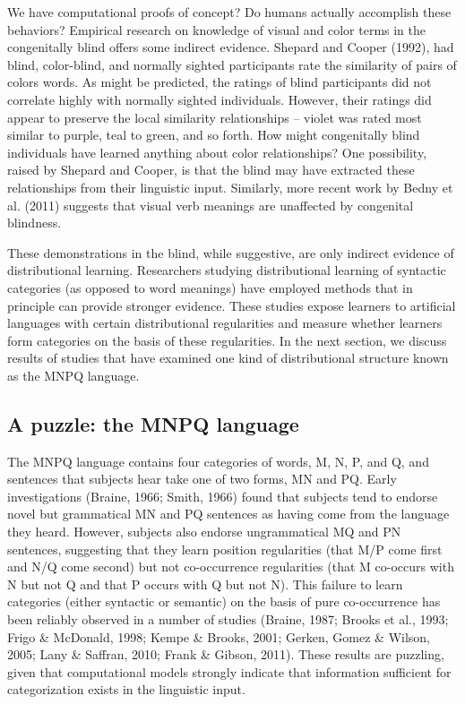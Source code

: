 \documentclass[man,floatsintext]{apa6}
\begin{document}
We have computational proofs of concept? Do humans actually accomplish these behaviors? Empirical research on knowledge of visual and color terms in the congenitally blind offers some indirect evidence. Shepard and Cooper (1992), had blind, color-blind, and normally sighted participants rate the similarity of pairs of colors words. As might be predicted, the ratings of blind participants did not correlate highly with normally sighted individuals. However, their ratings did appear to preserve the local similarity relationships -- violet was rated most similar to purple, teal to green, and so forth. How might congenitally blind individuals have learned anything about color relationships? One possibility, raised by Shepard and Cooper, is that the blind may have extracted these relationships from their linguistic input. Similarly, more recent work by Bedny et al. (2011) suggests that visual verb meanings are unaffected by congenital blindness. %

These demonstrations in the blind, while suggestive, are only indirect evidence of distributional learning. Researchers studying distributional learning of syntactic categories (as opposed to word meanings) have employed methods that in principle can provide stronger evidence. These studies expose learners to artificial languages with certain distributional regularities and measure whether learners form categories on the basis of these regularities. In the next section, we discuss results of studies that have examined one kind of distributional structure known as the MNPQ language.

\subsection{A puzzle: the MNPQ language}

The MNPQ language contains four categories of words, M, N, P, and Q, and sentences that subjects hear take one of two forms, MN and PQ. Early investigations (Braine, 1966; Smith, 1966) found that subjects tend to endorse novel but grammatical MN and PQ sentences as having come from the language they heard. However, subjects also endorse ungrammatical MQ and PN sentences, suggesting that they learn position regularities (that M/P come first and N/Q come second) but not co-occurrence regularities (that M co-occurs with N but not Q and that P occurs with Q but not N). This failure to learn categories (either syntactic or semantic) on the basis of pure co-occurrence has been reliably observed in a number of studies (Braine, 1987; Brooks et al., 1993; Frigo \& McDonald, 1998; Kempe \& Brooks, 2001; Gerken, Gomez \& Wilson, 2005; Lany \& Saffran, 2010; Frank \& Gibson, 2011). These results are puzzling, given that computational models strongly indicate that information sufficient for categorization exists in the linguistic input.
\end{document}

